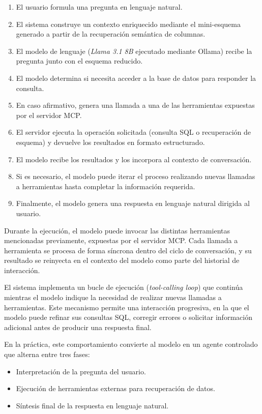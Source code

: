 \begin{enumerate}
\item El usuario formula una pregunta en lenguaje natural.
\item El sistema construye un contexto enriquecido mediante el mini-esquema generado a partir de la recuperación semántica de columnas.
\item El modelo de lenguaje (\textit{Llama 3.1 8B} ejecutado mediante Ollama) recibe la pregunta junto con el esquema reducido.
\item El modelo determina si necesita acceder a la base de datos para responder la consulta.
\item En caso afirmativo, genera una llamada a una de las herramientas expuestas por el servidor MCP.
\item El servidor ejecuta la operación solicitada (consulta SQL o recuperación de esquema) y devuelve los resultados en formato estructurado.
\item El modelo recibe los resultados y los incorpora al contexto de conversación.
\item Si es necesario, el modelo puede iterar el proceso realizando nuevas llamadas a herramientas hasta completar la información requerida.
\item Finalmente, el modelo genera una respuesta en lenguaje natural dirigida al usuario.
\end{enumerate}

Durante la ejecución, el modelo puede invocar las distintas herramientas mencionadas previamente, expuestas por el servidor MCP. Cada llamada a herramienta se procesa de forma síncrona dentro del ciclo de conversación, y su resultado se reinyecta en el contexto del modelo como parte del historial de interacción.

El sistema implementa un bucle de ejecución (\textit{tool-calling loop}) que continúa mientras el modelo indique la necesidad de realizar nuevas llamadas a herramientas. Este mecanismo permite una interacción progresiva, en la que el modelo puede refinar sus consultas SQL, corregir errores o solicitar información adicional antes de producir una respuesta final.

En la práctica, este comportamiento convierte al modelo en un agente controlado que alterna entre tres fases:

\begin{itemize}
\item Interpretación de la pregunta del usuario.
\item Ejecución de herramientas externas para recuperación de datos.
\item Síntesis final de la respuesta en lenguaje natural.
\end{itemize}

